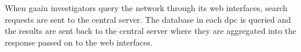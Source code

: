 When \gls{gaain} investigators query the network through its web interfaces, search
requests are sent to the central server.
The database in each \gls{dpc} is queried and the results are sent back to the
central server where they are aggregated into the response passed on to the web
interfaces.




